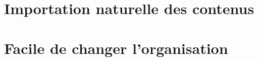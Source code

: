 \documentclass[varwidth, border = 3pt]{standalone}
\begin{document}
\section{Importation naturelle des contenus}



\section{Facile de changer l'organisation}

\end{document}
